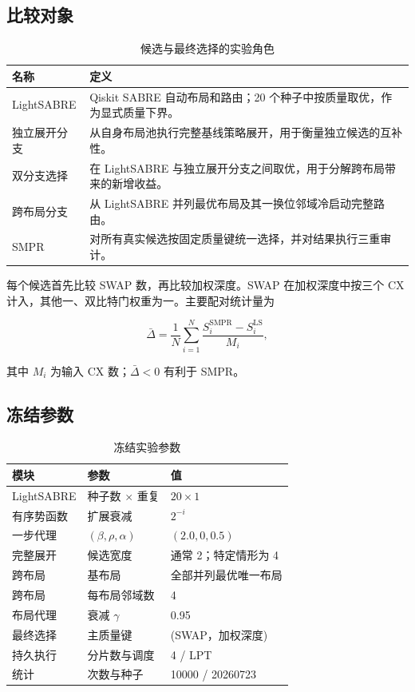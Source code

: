\documentclass[11pt,a4paper]{article}
\begin{document}
\subsection{比较对象}

\begin{table}[H]
\centering
\caption{候选与最终选择的实验角色}
\begin{tabularx}{\textwidth}{C{3.2cm}Y}
\toprule
名称 & 定义 \\
\midrule
LightSABRE & Qiskit SABRE 自动布局和路由；20 个种子中按质量取优，作为显式质量下界。\\
独立展开分支 & 从自身布局池执行完整基线策略展开，用于衡量独立候选的互补性。\\
双分支选择 & 在 LightSABRE 与独立展开分支之间取优，用于分解跨布局带来的新增收益。\\
跨布局分支 & 从 LightSABRE 并列最优布局及其一换位邻域冷启动完整路由。\\
SMPR & 对所有真实候选按固定质量键统一选择，并对结果执行三重审计。\\
\bottomrule
\end{tabularx}
\end{table}

每个候选首先比较 SWAP 数，再比较加权深度。SWAP 在加权深度中按三个 CX
计入，其他一、双比特门权重为一。主要配对统计量为

\[
\bar{\Delta}=
\frac{1}{N}\sum_{i=1}^{N}
\frac{S_i^{\mathrm{SMPR}}-S_i^{\mathrm{LS}}}{M_i},
\]

其中 $M_i$ 为输入 CX 数；$\bar{\Delta}<0$ 有利于 SMPR。

\subsection{冻结参数}

\begin{table}[H]
\centering
\caption{冻结实验参数}
\begin{tabularx}{\textwidth}{Y Y C{3.0cm}}
\toprule
模块 & 参数 & 值 \\
\midrule
LightSABRE & 种子数 $\times$ 重复 & $20\times1$ \\
有序势函数 & 扩展衰减 & $2^{-i}$ \\
一步代理 & $(\beta,\rho,\alpha)$ & $(2.0,0,0.5)$ \\
完整展开 & 候选宽度 & 通常 2；特定情形为 4 \\
跨布局 & 基布局 & 全部并列最优唯一布局 \\
跨布局 & 每布局邻域数 & 4 \\
布局代理 & 衰减 $\gamma$ & 0.95 \\
最终选择 & 主质量键 & (SWAP，加权深度) \\
持久执行 & 分片数与调度 & 4 / LPT \\
统计 & 次数与种子 & 10000 / 20260723 \\
\bottomrule
\end{tabularx}
\end{table}
\end{document}
